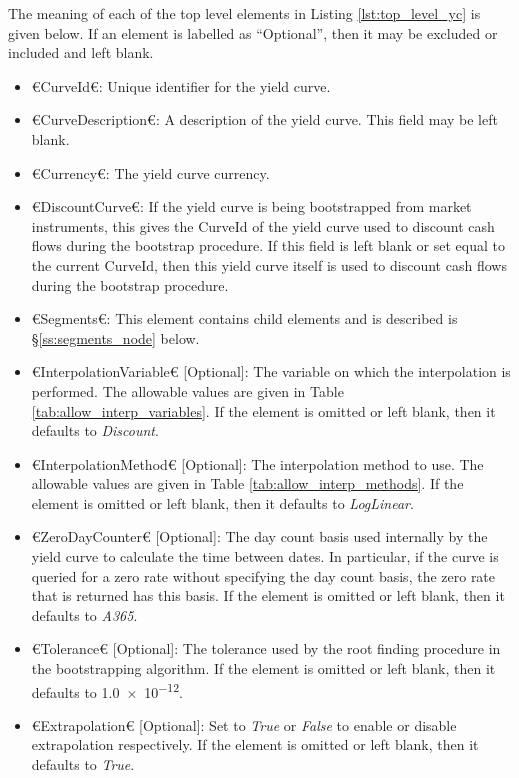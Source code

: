 The meaning of each of the top level elements in Listing \ref{lst:top_level_yc} is given below. If an element is labelled 
as ``Optional'', then it may be excluded or included and left blank.
\begin{itemize}
\item €CurveId€: Unique identifier for the yield curve.
\item €CurveDescription€: A description of the yield curve. This field may be left blank.
\item €Currency€: The yield curve currency.
\item €DiscountCurve€: If the yield curve is being bootstrapped from market instruments, this gives the CurveId of the yield 
curve used to discount cash flows during the bootstrap procedure. If this field is left blank or set equal to the current 
CurveId, then this yield curve itself is used to discount cash flows during the bootstrap procedure.
\item €Segments€: This element contains child elements and is described is \S \ref{ss:segments_node} below.
\item €InterpolationVariable€ [Optional]: The variable on which the interpolation is performed. The allowable values are 
given in Table \ref{tab:allow_interp_variables}. If the element is omitted or left blank, then it defaults to 
\emph{Discount}.
\item €InterpolationMethod€ [Optional]: The interpolation method to use. The allowable values are given in Table 
\ref{tab:allow_interp_methods}. If the element is omitted or left blank, then it defaults to \emph{LogLinear}.
\item €ZeroDayCounter€ [Optional]: The day count basis used internally by the yield curve to calculate the time between 
dates. In particular, if the curve is queried for a zero rate without specifying the day count basis, the zero rate that 
is returned has this basis. If the element is omitted or left blank, then it defaults to \emph{A365}.
\item €Tolerance€ [Optional]: The tolerance used by the root finding procedure in the bootstrapping algorithm. If the 
element is omitted or left blank, then it defaults to \num[scientific-notation=true]{1.0e-12}.
\item €Extrapolation€ [Optional]: Set to \emph{True} or \emph{False} to enable or disable extrapolation respectively. If the 
element is omitted or left blank, then it defaults to \emph{True}.
\end{itemize}

